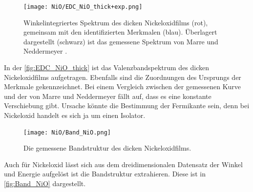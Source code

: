         \begin{figure}
            \centering
            \texttt{[image: NiO/EDC\_NiO\_thick+exp.png]}
            \caption{Winkelintegriertes Spektrum des dicken Nickeloxidfilms (rot), gemeinsam mit den identifizierten Merkmalen (blau).
            Überlagert dargestellt (schwarz) ist das gemessene Spektrum von Marre und Neddermeyer \cite{NiO_7}.} 
            \label{fig:EDC_NiO_thick}
        \end{figure}
        In der \autoref{fig:EDC_NiO_thick} ist das Valenzbandspektrum des dicken Nickeloxidfilms aufgetragen.
        Ebenfalls sind die Zuordnungen des Ursprungs der Merkmale gekennzeichnet.
        Bei einem Vergleich zwischen der gemessenen Kurve und der von Marre und Neddermeyer fällt auf, dass es eine konstante Verschiebung gibt.
        Ursache könnte die Bestimmung der Fermikante sein, denn bei Nickeloxid handelt es sich ja um einen Isolator.

        \begin{figure}
            \centering
            \texttt{[image: NiO/Band\_NiO.png]}
            \caption{Die gemessene Bandstruktur des dicken Nickeloxidfilms.}
            \label{fig:Band_NiO}
        \end{figure}
        Auch für Nickeloxid lässt sich aus dem dreidimensionalen Datensatz der Winkel und Energie aufgelöst ist die Bandstruktur extrahieren.
        Diese ist in \autoref{fig:Band_NiO} dargestellt.

